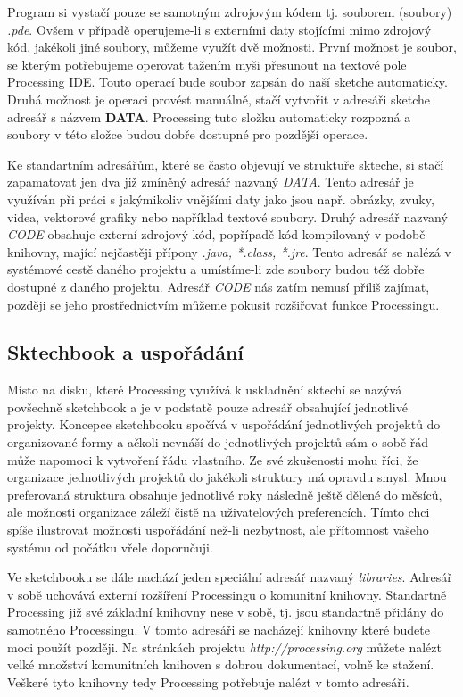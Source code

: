 \documentclass[10pt,twopage]{book}
\newcommand{\pododdil}[1]{\subsection{#1}\label{subsec:#1}}
\newcommand{\slovnik}[1]{\textbf{\gls{#1}}\index{#1}}
\begin{document}
Program si vystačí pouze se samotným zdrojovým kódem tj. souborem (soubory) {\em *.pde}. Ovšem v případě operujeme-li s externími daty stojícími mimo zdrojový kód, jakékoli jiné soubory, můžeme využít dvě možnosti. První možnost je soubor, se kterým potřebujeme operovat tažením myši přesunout na textové pole Processing IDE. Touto operací bude soubor zapsán do naší sketche automaticky. Druhá možnost je operaci provést manuálně, stačí vytvořit v adresáři sketche adresář s názvem \slovnik{DATA}. Processing tuto složku automaticky rozpozná a soubory v této složce budou dobře dostupné pro pozdější operace.

Ke standartním adresářům, které se často objevují ve struktuře skteche, si stačí zapamatovat jen dva již zmíněný adresář nazvaný {\em DATA}. Tento adresář je využíván při práci s jakýmikoliv vnějšími daty jako jsou např. obrázky, zvuky, videa, vektorové grafiky nebo například textové soubory. Druhý adresář nazvaný {\em CODE} obsahuje externí zdrojový kód, popřípadě kód kompilovaný v podobě knihovny, mající nejčastěji přípony {\em *.java, *.class, *.jre}. Tento adresář se nalézá v systémové cestě daného projektu a umístíme-li zde soubory budou též dobře dostupné z daného projektu. Adresář {\em CODE} nás zatím nemusí příliš zajímat, později se jeho prostřednictvím můžeme pokusit rozšiřovat funkce Processingu.


\pododdil{Sktechbook a uspořádání}

Místo na disku, které Processing využívá k uskladnění sktechí se nazývá povšechně sketchbook a je v podstatě pouze adresář obsahující jednotlivé projekty. Koncepce sketchbooku spočívá v uspořádání jednotlivých projektů do organizované formy a ačkoli nevnáší do jednotlivých projektů sám o sobě řád může napomoci k vytvoření řádu vlastního. Ze své zkušenosti mohu říci, že organizace jednotlivých projektů do jakékoli struktury má opravdu smysl. Mnou preferovaná struktura obsahuje jednotlivé roky následně ještě dělené do měsíců, ale možnosti organizace záleží čistě na uživatelových preferencích. Tímto chci spíše ilustrovat možnosti uspořádání než-li nezbytnost, ale přítomnost vašeho systému od počátku vřele doporučuji.

Ve sketchbooku se dále nachází jeden speciální adresář nazvaný {\em libraries}. Adresář v sobě uchovává externí rozšíření Processingu o komunitní knihovny. Standartně Processing již své základní knihovny nese v sobě, tj. jsou standartně přidány do samotného Processingu. V tomto adresáři se nacházejí knihovny které budete moci použít později. Na stránkách projektu {\em http://processing.org} můžete nalézt velké množství komunitních knihoven s dobrou dokumentací, volně ke stažení. Veškeré tyto knihovny tedy Processing potřebuje nalézt v tomto adresáři.
\end{document}
